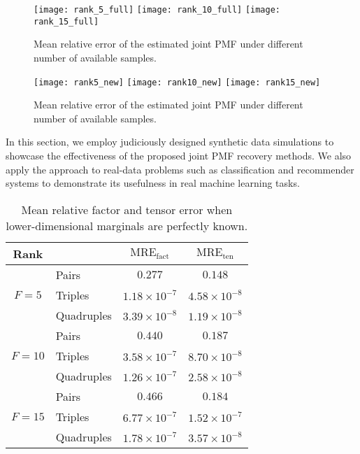 \documentclass[journal]{IEEEtran}
\begin{document}
\begin{figure*}[!t]
\centering
\texttt{[image: rank\_5\_full]}
\texttt{[image: rank\_10\_full]}
\texttt{[image: rank\_15\_full]}
\caption{Mean relative error of the estimated joint PMF under different number of available samples.}
\label{fig:synthetic_data}
\end{figure*}
\begin{figure*}[!t]
\centering
\texttt{[image: rank5\_new]}
\texttt{[image: rank10\_new]}
\texttt{[image: rank15\_new]}
\caption{Mean relative error of the estimated joint PMF under different number of available samples.}
\label{fig:synthetic_data2}
\end{figure*}


In this section, we employ judiciously designed synthetic data simulations to showcase the effectiveness of the proposed joint PMF recovery methods. We also apply the approach to real-data problems such as classification and recommender systems to demonstrate its usefulness in real machine learning tasks.

\begin{table}[!t]
\begin{center}
\caption{Mean relative factor and tensor error when  {lower-dimensional} marginals are perfectly known.}
\label{table:noiseless}
\begin{tabular}{c  l  c  c}
\hline
 Rank   &  & $\textrm{MRE}_{\textrm{fact}}$ & $\textrm{MRE}_{\textrm{ten}}$ \\
\hline
       & Pairs      &  $0.277$	              &  $0.148$                            \\
$F = 5$& Triples    &  $1.18 \times 10^{-7}$ &  $ 4.58 \times 10^{-8} $     \\
	   & Quadruples &  $3.39 \times 10^{-8}$ &  $ 1.19 \times 10^{-8}$		        \\
\hline
  		   &  Pairs       &  $ 0.440$			    &   $0.187$                      \\
$F = 10$   &  Triples     &  $3.58 \times 10^{-7}$	& 	$8.70 \times 10^{-8}$		       \\
	       &  Quadruples  &  $1.26 \times 10^{-7}$	& 	$2.58 \times 10^{-8}$		 \\
\hline
  		   &  Pairs       &  $0.466$			    &   $ 0.184$                      \\
$F = 15$   &  Triples     &  $6.77 \times 10^{-7}$	& 	$1.52 \times 10^{-7}$		       \\
	       &  Quadruples  &  $1.78 \times 10^{-7}$	& 	$3.57 \times 10^{-8}$\\
\hline
\end{tabular}
\end{center}
\end{table}
\end{document}
